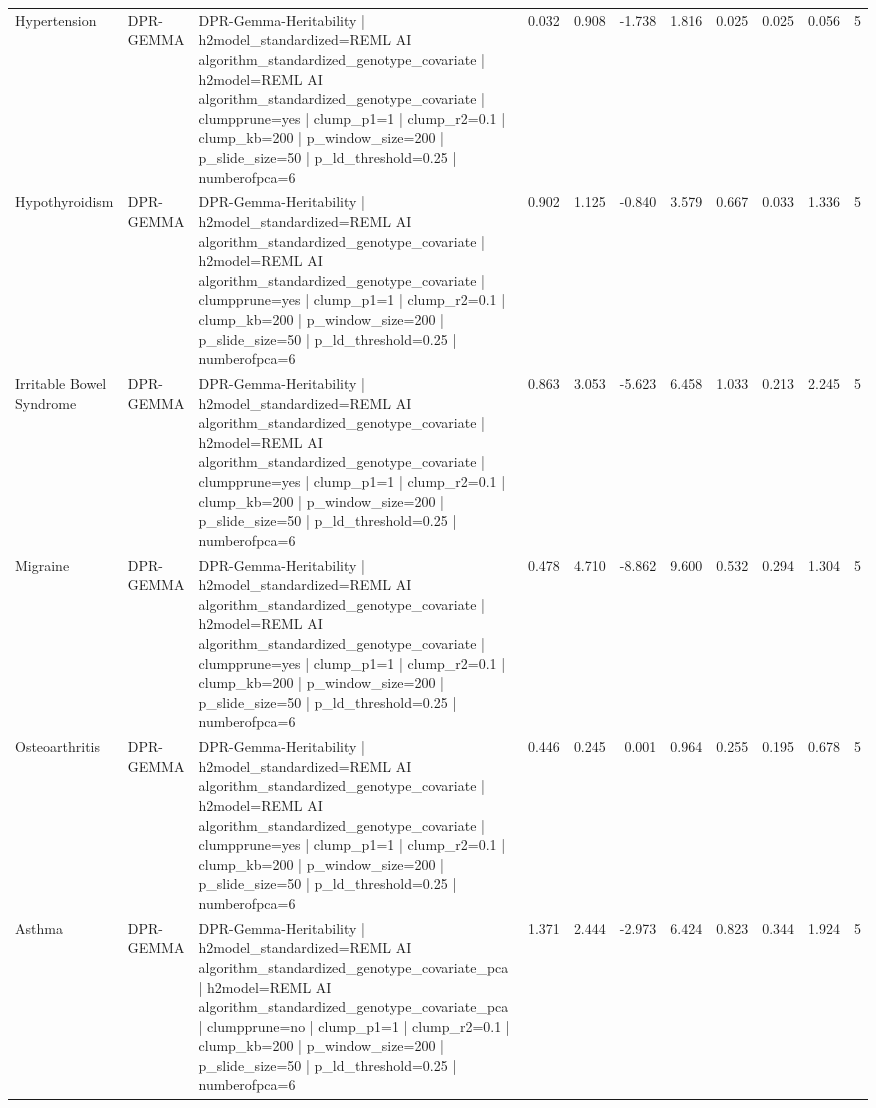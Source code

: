 \begin{landscape}
\begin{longtable}{p{2.4cm}p{1.8cm}p{6.0cm}rrrrrrrr}
Hypertension & DPR-GEMMA & DPR-Gemma-Heritability | h2model\_standardized=REML AI algorithm\_standardized\_genotype\_covariate | h2model=REML AI algorithm\_standardized\_genotype\_covariate | clumpprune=yes | clump\_p1=1 | clump\_r2=0.1 | clump\_kb=200 | p\_window\_size=200 | p\_slide\_size=50 | p\_ld\_threshold=0.25 | numberofpca=6 & 0.032 & 0.908 & -1.738 & 1.816 & 0.025 & 0.025 & 0.056 & 5 \\
Hypothyroidism & DPR-GEMMA & DPR-Gemma-Heritability | h2model\_standardized=REML AI algorithm\_standardized\_genotype\_covariate | h2model=REML AI algorithm\_standardized\_genotype\_covariate | clumpprune=yes | clump\_p1=1 | clump\_r2=0.1 | clump\_kb=200 | p\_window\_size=200 | p\_slide\_size=50 | p\_ld\_threshold=0.25 | numberofpca=6 & 0.902 & 1.125 & -0.840 & 3.579 & 0.667 & 0.033 & 1.336 & 5 \\
Irritable Bowel Syndrome & DPR-GEMMA & DPR-Gemma-Heritability | h2model\_standardized=REML AI algorithm\_standardized\_genotype\_covariate | h2model=REML AI algorithm\_standardized\_genotype\_covariate | clumpprune=yes | clump\_p1=1 | clump\_r2=0.1 | clump\_kb=200 | p\_window\_size=200 | p\_slide\_size=50 | p\_ld\_threshold=0.25 | numberofpca=6 & 0.863 & 3.053 & -5.623 & 6.458 & 1.033 & 0.213 & 2.245 & 5 \\
Migraine & DPR-GEMMA & DPR-Gemma-Heritability | h2model\_standardized=REML AI algorithm\_standardized\_genotype\_covariate | h2model=REML AI algorithm\_standardized\_genotype\_covariate | clumpprune=yes | clump\_p1=1 | clump\_r2=0.1 | clump\_kb=200 | p\_window\_size=200 | p\_slide\_size=50 | p\_ld\_threshold=0.25 | numberofpca=6 & 0.478 & 4.710 & -8.862 & 9.600 & 0.532 & 0.294 & 1.304 & 5 \\
Osteoarthritis & DPR-GEMMA & DPR-Gemma-Heritability | h2model\_standardized=REML AI algorithm\_standardized\_genotype\_covariate | h2model=REML AI algorithm\_standardized\_genotype\_covariate | clumpprune=yes | clump\_p1=1 | clump\_r2=0.1 | clump\_kb=200 | p\_window\_size=200 | p\_slide\_size=50 | p\_ld\_threshold=0.25 | numberofpca=6 & 0.446 & 0.245 & 0.001 & 0.964 & 0.255 & 0.195 & 0.678 & 5 \\
Asthma & DPR-GEMMA & DPR-Gemma-Heritability | h2model\_standardized=REML AI algorithm\_standardized\_genotype\_covariate\_pca | h2model=REML AI algorithm\_standardized\_genotype\_covariate\_pca | clumpprune=no | clump\_p1=1 | clump\_r2=0.1 | clump\_kb=200 | p\_window\_size=200 | p\_slide\_size=50 | p\_ld\_threshold=0.25 | numberofpca=6 & 1.371 & 2.444 & -2.973 & 6.424 & 0.823 & 0.344 & 1.924 & 5 \\

\end{longtable}
\end{landscape}
